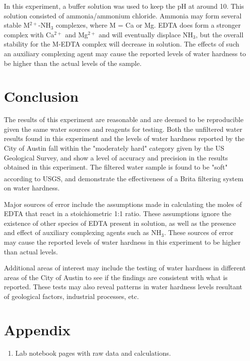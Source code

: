 \documentclass{article}
\begin{document}
In this experiment, a buffer solution was used to keep the pH at around 10. This
solution consisted of ammonia/ammonium chloride.
Ammonia may form several stable M$^{2+}$-NH$_3$ complexes, where M = Ca or Mg.
EDTA does form a stronger complex with Ca$^{2+}$ and Mg$^{2+}$ and will
eventually displace NH$_3$, but the overall stability for the M-EDTA complex
will decrease in solution. The effects of such an auxiliary complexing agent may
cause the reported levels of water hardness to be higher than the actual levels
of the sample.

\newpage
\section {Conclusion}

The results of this experiment are reasonable and are deemed to be reproducible
given the same water sources and reagents for testing.
Both the unfiltered water results found in this experiment and the levels of
water hardness reported by the City of Austin fall within the "moderately hard"
category given by the US Geological Survey, and show a level of accuracy and
precision in the results obtained in this experiment.
The filtered water sample is found to be "soft" according to USGS, and
demonstrate the effectiveness of a Brita\textsuperscript{\textregistered}
filtering system on water hardness.

Major sources of error include the assumptions made in calculating the moles of
EDTA that react in a stoichiometric 1:1 ratio. These assumptions ignore the
existence of other species of EDTA present in solution, as well as the presence
and effect of auxiliary complexing agents such as NH$_3$. These sources of error
may cause the reported levels of water hardness in this experiment to be higher
than actual levels.

Additional areas of interest may include the testing of water hardness in
different areas of the City of Austin to see if the findings are consistent with
what is reported. These tests may also reveal patterns in water hardness levels
resultant of geological factors, industrial processes, etc.


\newpage



\newpage


\section*{Appendix}

\begin{enumerate}
        \item Lab notebook pages with raw data and calculations.
\end{enumerate}
\end{document}
